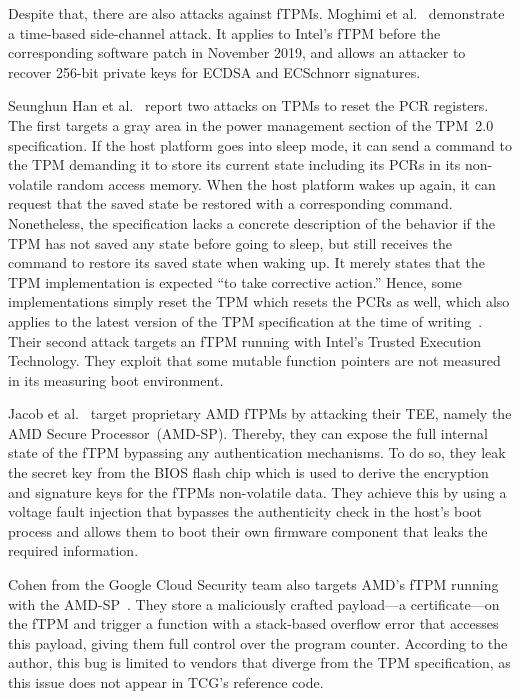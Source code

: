 Despite that, there are also attacks against \acp{fTPM}.
Moghimi et al.~\cite{Moghimi2019} demonstrate a time-based side-channel attack.
It applies to Intel's \ac{fTPM} before the corresponding software patch in November 2019, and allows an attacker to recover 256-bit private keys for ECDSA and ECSchnorr signatures.

Seunghun Han et al.~\cite{aBadDream} report two attacks on \acp{TPM} to reset the PCR registers.
The first targets a gray area in the power management section of the TPM~2.0 specification.
If the host platform goes into sleep mode, it can send a command to the TPM demanding it to store its current state including its PCRs in its non-volatile random access memory.
When the host platform wakes up again, it can request that the saved state be restored with a corresponding command.
Nonetheless, the specification lacks a concrete description of the behavior if the TPM has not saved any state before going to sleep, but still receives the command to restore its saved state when waking up.
It merely states that the TPM implementation is expected ``to take corrective action.''
Hence, some implementations simply reset the TPM which resets the \acp{PCR} as well, which also applies to the latest version of the TPM specification at the time of writing~\cite{tpm20}.
Their second attack targets an \ac{fTPM} running with Intel's Trusted Execution Technology.
They exploit that some mutable function pointers are not measured in its measuring boot environment.

Jacob et al.~\cite{Jacob2023} target proprietary AMD fTPMs by attacking their \ac{TEE}, namely the AMD Secure Processor~(AMD-SP).
Thereby, they can expose the full internal state of the \ac{fTPM} bypassing any authentication mechanisms.
To do so, they leak the secret key from the BIOS flash chip which is used to derive the encryption and signature keys for the \acp{fTPM} non-volatile data.
They achieve this by using a voltage fault injection that bypasses the authenticity check in the host's boot process and allows them to boot their own firmware component that leaks the required information.

Cohen from the Google Cloud Security team also targets AMD's fTPM running with the AMD-SP~\cite{cohen}.
They store a maliciously crafted payload---a certificate---on the \ac{fTPM} and trigger a function with a stack-based overflow error that accesses this payload, giving them full control over the program counter.
According to the author, this bug is limited to vendors that diverge from the \ac{TPM} specification, as this issue does not appear in \ac{TCG}'s reference code.


